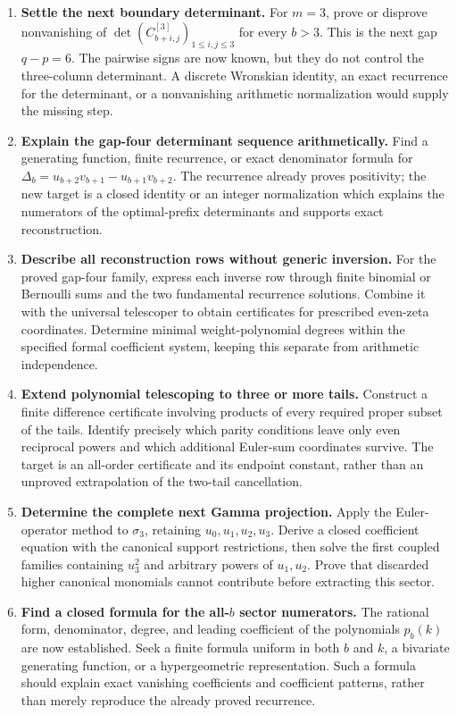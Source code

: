 \begin{enumerate}
\item \textbf{Settle the next boundary determinant.}
For $m=3$, prove or disprove nonvanishing of
$\det(C_{b+i,j}^{[3]})_{1\le i,j\le3}$ for every $b>3$.
This is the next gap $q-p=6$. The pairwise signs are now known, but
they do not control the three-column determinant. A discrete Wronskian
identity, an exact recurrence for the determinant, or a nonvanishing
arithmetic normalization would supply the missing step.

\item \textbf{Explain the gap-four determinant sequence arithmetically.}
Find a generating function, finite recurrence, or exact denominator
formula for $\Delta_b=u_{b+2}v_{b+1}-u_{b+1}v_{b+2}$.
The recurrence already proves positivity; the new target is a closed
identity or an integer normalization which explains the numerators
of the optimal-prefix determinants and supports exact reconstruction.

\item \textbf{Describe all reconstruction rows without generic inversion.}
For the proved gap-four family, express each inverse row through
finite binomial or Bernoulli sums and the two fundamental recurrence
solutions. Combine it with the universal telescoper to obtain
certificates for prescribed even-zeta coordinates. Determine minimal
weight-polynomial degrees within the specified formal coefficient
system, keeping this separate from arithmetic independence.

\item \textbf{Extend polynomial telescoping to three or more tails.}
Construct a finite difference certificate involving products of every
required proper subset of the tails. Identify precisely which parity
conditions leave only even reciprocal powers and which additional
Euler-sum coordinates survive. The target is an all-order certificate
and its endpoint constant, rather than an unproved extrapolation of
the two-tail cancellation.

\item \textbf{Determine the complete next Gamma projection.}
Apply the Euler-operator method to $\sigma_3$, retaining
$u_0,u_1,u_2,u_3$. Derive a closed coefficient equation with the
canonical support restrictions, then solve the first coupled families
containing $u_3^2$ and arbitrary powers of $u_1,u_2$.
Prove that discarded higher canonical monomials cannot contribute
before extracting this sector.

\item \textbf{Find a closed formula for the all-$b$ sector numerators.}
The rational form, denominator, degree, and leading coefficient of
the polynomials $p_b(k)$ are now established. Seek a finite formula
uniform in both $b$ and $k$, a bivariate generating function, or a
hypergeometric representation. Such a formula should explain exact
vanishing coefficients and coefficient patterns, rather than merely
reproduce the already proved recurrence.


\end{enumerate}
